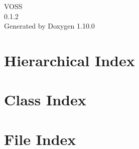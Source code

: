 \documentclass[twoside]{book}
\newcommand{\+}{\discretionary{\mbox{\scriptsize$\hookleftarrow$}}{}{}}
\newcommand{\clearemptydoublepage}{%
    \newpage{\pagestyle{empty}\cleardoublepage}%
  }
\begin{document}
  \raggedbottom
    \hypersetup{pageanchor=false,
                bookmarksnumbered=true,
                pdfencoding=unicode
               }
  \begin{titlepage}
  \vspace*{7cm}
  \begin{center}%
  {\Large VOSS}\\
  [1ex]\large 0.\+1.\+2 \\
  \vspace*{1cm}
  {\large Generated by Doxygen 1.10.0}\\
  \end{center}
  \end{titlepage}
  \clearemptydoublepage
  \tableofcontents
  \clearemptydoublepage
  \hypersetup{pageanchor=true}
\chapter{Hierarchical Index}

\chapter{Class Index}

\chapter{File Index}

\end{document}
